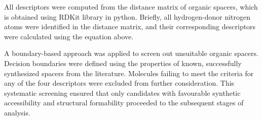 	
All descriptors were computed from the distance matrix of organic spacers, which is obtained using RDKit library in python. Briefly, all hydrogen-donor nitrogen atoms were identified in the distance matrix, and their corresponding descriptors were calculated using the equation above.

A boundary-based approach was applied to screen out unsuitable organic spacers. Decision boundaries were defined using the properties of known, successfully synthesized spacers from the literature. Molecules failing to meet the criteria for any of the four descriptors were excluded from further consideration. This systematic screening ensured that only candidates with favourable synthetic accessibility and structural formability proceeded to the subsequent stages of analysis.
